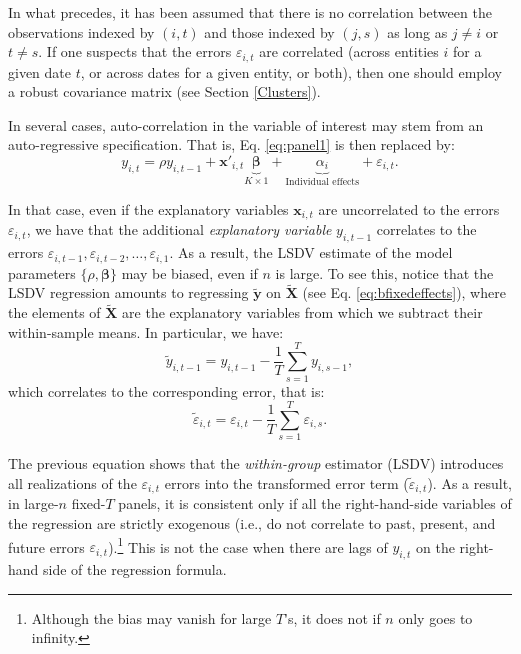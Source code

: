 \documentclass[
  12pt,
]{book}
\theoremstyle{definition}
\theoremstyle{definition}
\theoremstyle{definition}
\theoremstyle{definition}
\theoremstyle{remark}
\begin{document}
In what precedes, it has been assumed that there is no correlation between the observations indexed by \((i,t)\) and those indexed by \((j,s)\) as long as \(j \ne i\) or \(t \ne s\). If one suspects that the errors \(\varepsilon_{i,t}\) are correlated (across entities \(i\) for a given date \(t\), or across dates for a given entity, or both), then one should employ a robust covariance matrix (see Section \ref{Clusters}).

In several cases, auto-correlation in the variable of interest may stem from an auto-regressive specification. That is, Eq. \eqref{eq:panel1} is then replaced by:
\begin{equation}
y_{i,t} = \rho y_{i,t-1} + \mathbf{x}'_{i,t}\underbrace{\boldsymbol\beta}_{K \times 1} + \underbrace{\alpha_i}_{\mbox{Individual effects}} + \varepsilon_{i,t}.\label{eq:paneldyn}
\end{equation}

In that case, even if the explanatory variables \(\mathbf{x}_{i,t}\) are uncorrelated to the errors \(\varepsilon_{i,t}\), we have that the additional \emph{explanatory variable} \(y_{i,t-1}\) correlates to the errors \(\varepsilon_{i,t-1},\varepsilon_{i,t-2},\dots,\varepsilon_{i,1}\). As a result, the LSDV estimate of the model parameters \(\{\rho,\boldsymbol\beta\}\) may be biased, even if \(n\) is large. To see this, notice that the LSDV regression amounts to regressing \(\widetilde{\mathbf{y}}\) on \(\widetilde{\mathbf{X}}\) (see Eq. \eqref{eq:bfixedeffects}), where the elements of \(\widetilde{\mathbf{X}}\) are the explanatory variables from which we subtract their within-sample means. In particular, we have:
\[
\tilde{y}_{i,t-1} = y_{i,t-1} - \frac{1}{T} \sum_{s=1}^{T} y_{i,s-1},
\]
which correlates to the corresponding error, that is:
\[
\tilde{\varepsilon}_{i,t} = \varepsilon_{i,t} - \frac{1}{T} \sum_{s=1}^{T} \varepsilon_{i,s}.
\]

The previous equation shows that the \emph{within-group} estimator (LSDV) introduces all realizations of the \(\varepsilon_{i,t}\) errors into the transformed error term (\(\tilde{\varepsilon}_{i,t}\)). As a result, in large-\(n\) fixed-\(T\) panels, it is consistent only if all the right-hand-side variables of the regression are strictly exogenous (i.e., do not correlate to past, present, and future errors \(\varepsilon_{i,t}\)).\footnote{Although the bias may vanish for large \(T\)'s, it does not if \(n\) only goes to infinity.} This is not the case when there are lags of \(y_{i,t}\) on the right-hand side of the regression formula.
\end{document}

